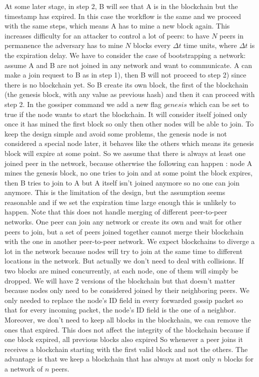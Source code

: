 \documentclass[twocolumn]{article}
\begin{document}
At some later stage, in step 2, B will see that A is in the blockchain but the timestamp has expired. In this case the workflow is the same and we proceed with the same steps, which means A has to mine a new block again. This increases difficulty for an attacker to control a lot of peers: to have $N$ peers in permanence the adversary has to mine $N$ blocks every $\Delta t$ time units, where $\Delta t$ is the expiration delay.
\linebreak
We have to consider the case of bootstrapping a network: assume A and B are not joined in any network and want to communicate. A can make a join request to B as in step 1), then B will not proceed to step 2) since there is no blockchain yet. So B create its own block, the first of the blockchain (the genesis block, with any value as previous hash) and then it can proceed with step 2. In the gossiper command we add a new flag $genesis$ which can be set to true if the node wants to start the blockchain. It will consider itself joined only once it has mined the first block so only then other nodes will be able to join. To keep the design simple and avoid some problems, the genesis node is not considered a special node later, it behaves like the others which means its genesis block will expire at some point. So we assume that there is always at least one joined peer in the network, because otherwise the following can happen : node A mines the genesis block, no one tries to join and at some point the block expires, then B tries to join to A but A itself isn't joined anymore so no one can join anymore. This is the limitation of the design, but the assumption seems reasonable and if we set the expiration time large enough this is unlikely to happen.
\linebreak
Note that this does not handle merging of different peer-to-peer networks. One peer can join any network or create its own and wait for other peers to join, but a set of peers joined together cannot merge their blockchain with the one in another peer-to-peer network. We expect blockchains to diverge a lot in the network because nodes will try to join at the same time to different locations in the network. But actually we don't need to deal with collisions. If two blocks are mined concurrently, at each node, one of them will simply be dropped. We will have 2 versions of the blockchain but that doesn't matter because nodes only need to be considered joined by their neighboring peers. We only needed to replace the node's ID field in every forwarded gossip packet so that for every incoming packet, the node's ID field is the one of a neighbor.
\linebreak
Moreover, we don't need to keep all blocks in the blockchain, we can remove the ones that expired. This does not affect the integrity of the blockchain because if one block expired, all previous blocks also expired So whenever a peer joins it receives a blockchain starting with the first valid block and not the others. The advantage is that we keep a blockchain that has always at most only $n$ blocks for a network of $n$ peers.
\end{document}
